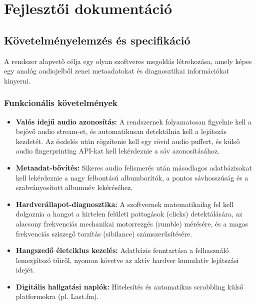 
\chapter{Fejlesztői dokumentáció}

\section{Követelményelemzés és specifikáció}
A rendszer alapvető célja egy olyan szoftveres megoldás létrehozása, amely képes egy analóg audiojelből zenei metaadatokat és diagnosztikai információkat kinyerni. 

\subsection{Funkcionális követelmények}
\begin{itemize}
    \item \textbf{Valós idejű audio azonosítás:} A rendszernek folyamatosan figyelnie kell a bejövő audio stream-et, és automatikusan detektálnia kell a lejátszás kezdetét. Az észlelés után rögzítenie kell egy rövid audio puffert, és külső audio fingerprinting API-kat kell lekérdeznie a sáv azonosításához.
    \item \textbf{Metaadat-bővítés:} Sikeres audio felismerés után másodlagos adatbázisokat kell lekérdeznie a nagy felbontású albumborítók, a pontos sávhosszúság és a szabványosított albumnév lekéréséhez.
    \item \textbf{Hardverállapot-diagnosztika:} A szoftvernek matematikailag fel kell dolgoznia a hangot a hirtelen felületi pattogások (clicks) detektálására, az alacsony frekvenciás mechanikai motorrezgés (rumble) mérésére, és a magas frekvenciás sziszegő torzítás (sibilance) számszerűsítésére.
    \item \textbf{Hangszedő életciklus kezelés:} Adatbázis fenntartása a felhasználó lemezjátszó tűiről, nyomon követve az aktív hardver kumulatív lejátszási idejét.
    \item \textbf{Digitális hallgatási naplók:} Hitelesítés és automatikus scrobbling külső platformokra (pl. Last.fm).
\end{itemize}

